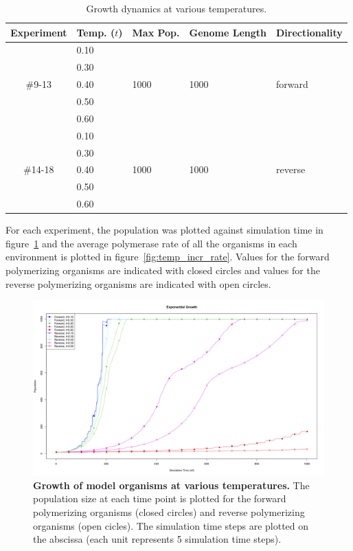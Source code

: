\begin{table}
	\begin{center}
		\begin{tabular}[c]{ c | l | l | l | l }
			Experiment & Temp. ($t$) & Max Pop. & Genome Length & Directionality \\
			\hline
			& 0.10 & & &\\
			& 0.30 & & &\\
			\#9-13 & 0.40 & 1000 & 1000 & forward \\
			& 0.50 & & &\\
			& 0.60 & & &\\
			\hline
			& 0.10 & & &\\
			& 0.30 & & &\\
			\#14-18 & 0.40 & 1000 & 1000 & reverse \\
			& 0.50 & & &\\
			& 0.60 & & &\\
		\end{tabular}
		\caption{Growth dynamics at various temperatures.}
		\label{tab:temp_incr}
	\end{center}
\end{table}

For each experiment, the population was plotted against simulation time in figure~\ref{fig:temp_incr_num} and the average polymerase rate of all the organisms in each environment is plotted in figure~\ref{fig:temp_incr_rate}. Values for the forward polymerizing organisms are indicated with closed circles and values for the reverse polymerizing organisms are indicated with open circles.

\begin{figure}[h]
	\centering
		\includegraphics[width=\textwidth]{temp_incr_num}
	\caption{\textbf{Growth of model organisms at various temperatures.} The population size at each time point is plotted for the forward polymerizing organisms (closed circles) and reverse polymerizing organisms (open cicles). The simulation time steps are plotted on the abscissa (each unit represents 5 simulation time steps).}
	\label{fig:temp_incr_num}
\end{figure}

